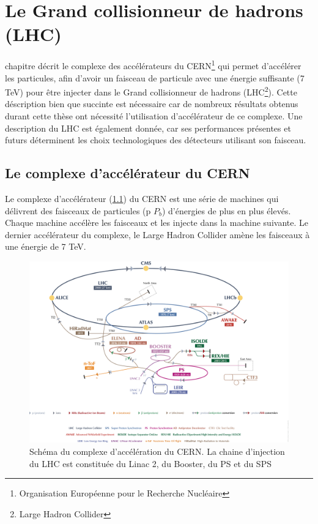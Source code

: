 \chapter{Le Grand collisionneur de hadrons (LHC)}
\renewcommand\chapterillustration{LHC/lhc}
\ThisULCornerWallPaper{1}{\chapterillustration}
\minitoc
\vspace{1cm}
 chapitre décrit le complexe des accélérateurs du CERN\footnote{Organisation Européenne pour le Recherche Nucléaire} qui permet d'accélérer les particules, afin d'avoir un faisceau de particule avec une énergie suffisante (7 TeV) pour être injecter dans le Grand collisionneur de hadrons (LHC\footnote{Large Hadron Collider}). Cette déscription bien que succinte est nécessaire car de nombreux résultats obtenus durant cette thèse ont nécessité l'utilisation d'accélérateur de ce complexe. Une description du LHC est également donnée, car ses performances présentes et futurs déterminent les choix technologiques des détecteurs utilisant son faisceau.

\section{Le complexe d'accélérateur du CERN}
Le complexe d'accélérateur (\ref{complexe}) du CERN est une série de machines qui délivrent des faisceaux de particules (p $P_{b}$) d'énergies de plus en plus élevés. Chaque machine accélère les faisceaux et les injecte dans la machine suivante. Le dernier accélérateur du complexe, le Large Hadron Collider amène les faisceaux à une énergie de 7 TeV.
\begin{figure}[h]
	\centering
  \includegraphics[scale=0.3]{LHC/complexe.png}
  \caption{Schéma du complexe d'accélération du CERN. La chaine d'injection du LHC est constituée du Linac 2, du Booster, du PS et du SPS}
  \label{complexe}
\end{figure}
